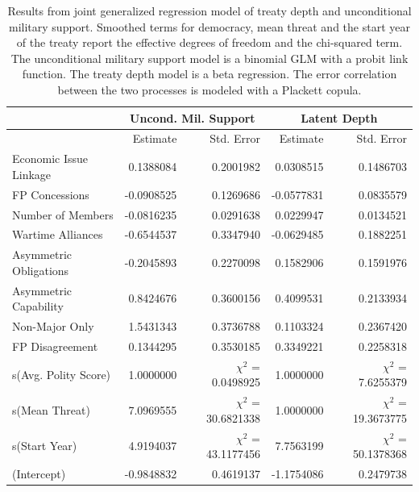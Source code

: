 \documentclass[12pt]{article}
\begin{document}
\begin{table}[ht]
\centering
\begin{tabular}{lrrrr}
  & \multicolumn{2}{c}{Uncond. Mil. Support} & \multicolumn{2}{c}{Latent Depth}\\ \hline
   & Estimate & Std. Error & Estimate & Std. Error \\ 
  \hline
  Economic Issue Linkage & 0.1388084 & 0.2001982 & 0.0308515 & 0.1486703 \\ 
  FP Concessions & -0.0908525 & 0.1269686 & -0.0577831 & 0.0835579 \\ 
  Number of Members & -0.0816235 & 0.0291638 & 0.0229947 & 0.0134521 \\ 
  Wartime Alliances & -0.6544537 & 0.3347940 & -0.0629485 & 0.1882251 \\ 
  Asymmetric Obligations & -0.2045893 & 0.2270098 & 0.1582906 & 0.1591976 \\ 
  Asymmetric Capability & 0.8424676 & 0.3600156 & 0.4099531 & 0.2133934 \\ 
  Non-Major Only & 1.5431343 & 0.3736788 & 0.1103324 & 0.2367420 \\ 
  FP Disagreement & 0.1344295 & 0.3530185 & 0.3349221 & 0.2258318 \\ 
  s(Avg. Polity Score) & 1.0000000 & $\chi^2$ = 0.0498925 & 1.0000000 & $\chi^2$ = 7.6255379 \\ 
  s(Mean Threat) & 7.0969555 & $\chi^2$ = 30.6821338 & 1.0000000 & $\chi^2$ = 19.3673775 \\ 
  s(Start Year) & 4.9194037 & $\chi^2$ = 43.1177456 & 7.7563199 & $\chi^2$ = 50.1378368 \\ 
  (Intercept) & -0.9848832 & 0.4619137 & -1.1754086 & 0.2479738 \\ 
   \hline
\end{tabular}
\caption{Results from joint generalized regression model of treaty depth and unconditional military support. 
          Smoothed terms for democracy, mean threat and the start year of the treaty report the effective degrees of freedom and the chi-squared term. 
                     The unconditional military support model is a binomial GLM with a probit link function. 
                     The treaty depth model is a beta regression. 
                     The error correlation between the two processes is modeled with a Plackett copula.} 
\label{tab:gjrm-res}
\end{table}
\end{document}
